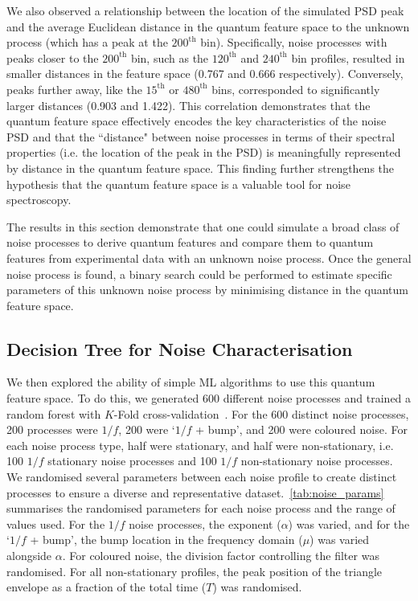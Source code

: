 \documentclass[12pt]{iopart}
\begin{document}
We also observed a relationship between the location of the simulated PSD peak and the average Euclidean distance in the quantum feature space to the unknown process (which has a peak at the $200^\mathrm{th}$ bin). Specifically, noise processes with peaks closer to the $200^\mathrm{th}$ bin, such as the $120^\mathrm{th}$ and $240^\mathrm{th}$ bin profiles, resulted in smaller distances in the feature space (0.767 and 0.666 respectively). Conversely, peaks further away, like the $15^\mathrm{th}$ or $480^\mathrm{th}$ bins, corresponded to significantly larger distances (0.903 and 1.422). This correlation demonstrates that the quantum feature space effectively encodes the key characteristics of the noise PSD and that the ``distance" between noise processes in terms of their spectral properties (i.e. the location of the peak in the PSD) is meaningfully represented by distance in the quantum feature space. This finding further strengthens the hypothesis that the quantum feature space is a valuable tool for noise spectroscopy.

The results in this section demonstrate that one could simulate a broad class of noise processes to derive quantum features and compare them to quantum features from experimental data with an unknown noise process. Once the general noise process is found, a binary search could be performed to estimate specific parameters of this unknown noise process by minimising distance in the quantum feature space.

\subsection{Decision Tree for Noise Characterisation \label{subsec:decision_tree_for_noise_characterisation}}
We then explored the ability of simple ML algorithms to use this quantum feature space. To do this, we generated 600 different noise processes and trained a random forest with $K$-Fold cross-validation~\cite{james2013introduction, scikit-learn}. For the 600 distinct noise processes, 200 processes were $1/f$, 200 were `$1/f$ + bump', and 200 were coloured noise. For each noise process type, half were stationary, and half were non-stationary, i.e. 100 $1/f$ stationary noise processes and 100 $1/f$ non-stationary noise processes. We randomised several parameters between each noise profile to create distinct processes to ensure a diverse and representative dataset.~\cref{tab:noise_params} summarises the randomised parameters for each noise process and the range of values used. For the $1/f$ noise processes, the exponent ($\alpha$) was varied, and for the `$1/f$ + bump', the bump location in the frequency domain ($\mu$) was varied alongside $\alpha$. For coloured noise, the division factor controlling the filter was randomised. For all non-stationary profiles, the peak position of the triangle envelope as a fraction of the total time ($T$) was randomised.
\end{document}
